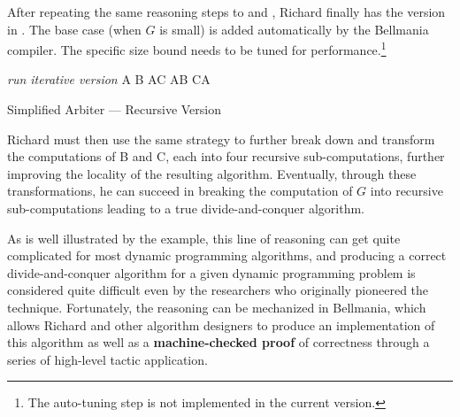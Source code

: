 After repeating
the same reasoning steps to  and ,
Richard finally has the version in .
The base case (when $G$ is small) is added automatically by the Bellmania compiler.
The specific size bound needs to be tuned for performance.\footnote{The auto-tuning step is not implemented in the current version.}


\begin{algorithm}
\renewcommand\arraystretch{1.3}
\begin{algorithmic}
\EndProcedure
   {\it run iterative version}
  \Else
  \State A 
  \State B    
  \State A
  \State C    
  \State A
  \State B    
  \State C
  \State A
  \EndIf
\end{algorithmic}
\caption{\label{overview:recursive-A}
   Simplified Arbiter --- Recursive Version}
\end{algorithm}

Richard must then use the same strategy to further break down and
transform the computations of B and C, each into four recursive sub-computations, 
further improving the locality of the resulting algorithm.
Eventually, through these transformations, he can succeed in breaking the computation of $G$ into recursive sub-computations leading to a true divide-and-conquer algorithm. 

As is well illustrated by the example, this line of reasoning can get quite complicated for most dynamic programming algorithms, 
and producing a correct divide-and-conquer algorithm for a given dynamic programming problem is considered quite difficult even by the researchers who originally pioneered the technique. 
Fortunately, the reasoning can be mechanized in Bellmania, which allows
Richard and other algorithm designers to produce an implementation of this algorithm
as well as a {\bf machine-checked proof} of correctness
through a series of high-level tactic application.

